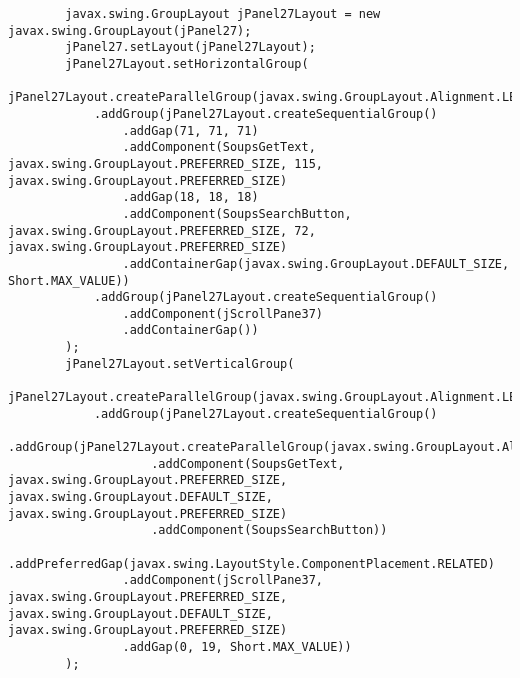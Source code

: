 \documentclass[12pt,a4paper]{article}
\begin{document}
\begin{lstlisting}
        javax.swing.GroupLayout jPanel27Layout = new javax.swing.GroupLayout(jPanel27);
        jPanel27.setLayout(jPanel27Layout);
        jPanel27Layout.setHorizontalGroup(
            jPanel27Layout.createParallelGroup(javax.swing.GroupLayout.Alignment.LEADING)
            .addGroup(jPanel27Layout.createSequentialGroup()
                .addGap(71, 71, 71)
                .addComponent(SoupsGetText, javax.swing.GroupLayout.PREFERRED_SIZE, 115, javax.swing.GroupLayout.PREFERRED_SIZE)
                .addGap(18, 18, 18)
                .addComponent(SoupsSearchButton, javax.swing.GroupLayout.PREFERRED_SIZE, 72, javax.swing.GroupLayout.PREFERRED_SIZE)
                .addContainerGap(javax.swing.GroupLayout.DEFAULT_SIZE, Short.MAX_VALUE))
            .addGroup(jPanel27Layout.createSequentialGroup()
                .addComponent(jScrollPane37)
                .addContainerGap())
        );
        jPanel27Layout.setVerticalGroup(
            jPanel27Layout.createParallelGroup(javax.swing.GroupLayout.Alignment.LEADING)
            .addGroup(jPanel27Layout.createSequentialGroup()
                .addGroup(jPanel27Layout.createParallelGroup(javax.swing.GroupLayout.Alignment.BASELINE)
                    .addComponent(SoupsGetText, javax.swing.GroupLayout.PREFERRED_SIZE, javax.swing.GroupLayout.DEFAULT_SIZE, javax.swing.GroupLayout.PREFERRED_SIZE)
                    .addComponent(SoupsSearchButton))
                .addPreferredGap(javax.swing.LayoutStyle.ComponentPlacement.RELATED)
                .addComponent(jScrollPane37, javax.swing.GroupLayout.PREFERRED_SIZE, javax.swing.GroupLayout.DEFAULT_SIZE, javax.swing.GroupLayout.PREFERRED_SIZE)
                .addGap(0, 19, Short.MAX_VALUE))
        );


\end{lstlisting}
\end{document}
